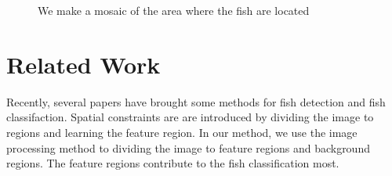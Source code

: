 \documentclass[conference]{IEEEtran}
\begin{document}
\newpage
\begin{figure}[!ht]
\centering
{}
  \hspace{0.15in}
  \hspace{0.15in}
  \caption{We make a mosaic of the area where the fish are located}
\end{figure}

 

\section{Related Work}

Recently, several papers have brought some methods for fish detection and fish classifaction. Spatial constraints are are introduced by dividing the image to regions and learning the feature region. In our method, we use the image processing method to dividing the image to feature regions and background regions. The feature regions contribute to the fish classification most. 
\end{document}
